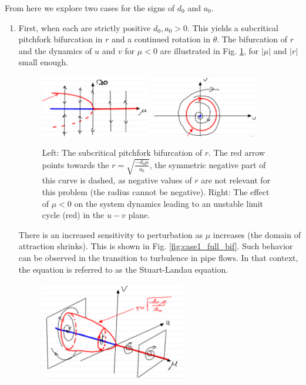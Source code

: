 From here we explore two cases for the signs of $d_0$ and $a_0$.
\begin{enumerate}
	\item First, when each are strictly positive $d_0, a_0 >0$. This yields a subcritical pitchfork bifurcation in $r$ and a continued rotation in $\theta $. The bifurcation of $r$ and the dynamics of $u$ and $v$ for $\mu < 0 $ are illustrated in Fig. \ref{fig:case1_hb}, for $|\mu |$ and $|r|$ small enough.
		\begin{figure}[h!]
			\centering
			\includegraphics[width=0.45\textwidth]{figures/ch3/19case1_r_bif.png}
			\includegraphics[width=0.45\textwidth]{figures/ch3/20case1_theta_bif.png}
			\caption{Left: The subcritical pitchfork bifurcation of $r$. The red arrow points towards the $r = \sqrt{\frac{-d_0 \mu }{a_0}}$, the symmetric negative part of this curve is dashed, as negative values of $r$ are not relevant for this problem (the radius cannot be negative). Right: The effect of $\mu <0$ on the system dynamics leading to an unstable limit cycle (red) in the $u-v$ plane.}
			\label{fig:case1_hb}
		\end{figure}
		There is an increased sensitivity to perturbation as $\mu $ increases (the domain of attraction shrinks). This is shown in Fig. \ref{fig:case1_full_bif}. Such behavior can be observed in the transition to turbulence in pipe flows. In that context, the equation is referred to as the Stuart-Landau equation.
		\begin{figure}[h!]
			\centering
			\includegraphics[width=0.6\textwidth]{figures/ch3/21case1_full_bif.png}

\end{figure}
\end{enumerate}
